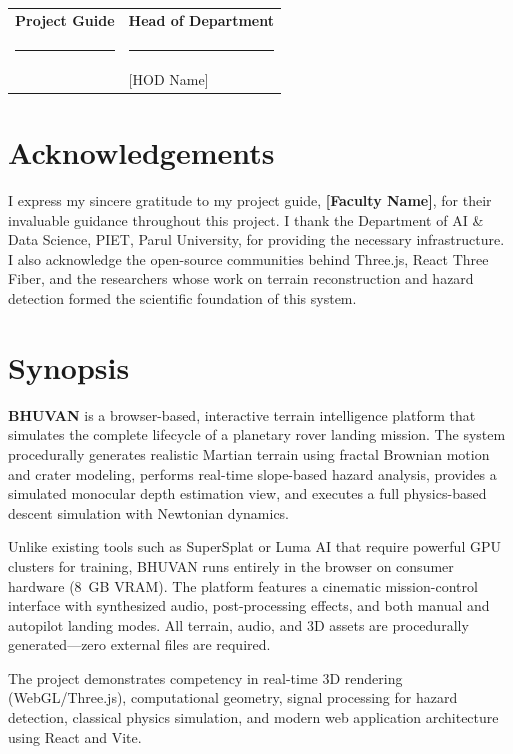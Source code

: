 \documentclass[12pt,a4paper]{report}
\begin{document}
\vspace{2cm}
\noindent
\begin{tabular}{p{7cm}p{7cm}}
\textbf{Project Guide} & \textbf{Head of Department} \\[2cm]
\rule{5cm}{0.4pt} & \rule{5cm}{0.4pt} \\
[Faculty Name] & [HOD Name] \\
\end{tabular}

\chapter*{Acknowledgements}
I express my sincere gratitude to my project guide, \textbf{[Faculty Name]}, for their invaluable guidance throughout this project. I thank the Department of AI \& Data Science, PIET, Parul University, for providing the necessary infrastructure. I also acknowledge the open-source communities behind Three.js, React Three Fiber, and the researchers whose work on terrain reconstruction and hazard detection formed the scientific foundation of this system.

\chapter*{Synopsis}
\textbf{BHUVAN} is a browser-based, interactive terrain intelligence platform that simulates the complete lifecycle of a planetary rover landing mission. The system procedurally generates realistic Martian terrain using fractal Brownian motion and crater modeling, performs real-time slope-based hazard analysis, provides a simulated monocular depth estimation view, and executes a full physics-based descent simulation with Newtonian dynamics.

Unlike existing tools such as SuperSplat or Luma AI that require powerful GPU clusters for training, BHUVAN runs entirely in the browser on consumer hardware (8~GB VRAM). The platform features a cinematic mission-control interface with synthesized audio, post-processing effects, and both manual and autopilot landing modes. All terrain, audio, and 3D assets are procedurally generated---zero external files are required.

The project demonstrates competency in real-time 3D rendering (WebGL/Three.js), computational geometry, signal processing for hazard detection, classical physics simulation, and modern web application architecture using React and Vite.
\end{document}
